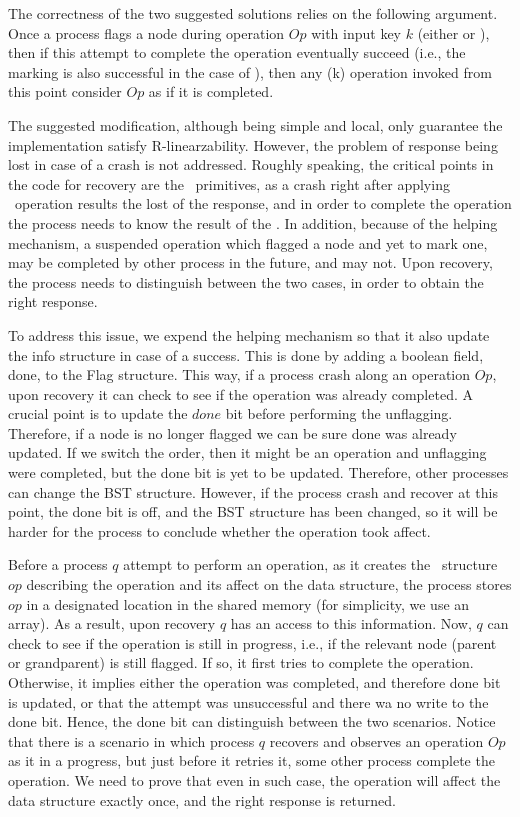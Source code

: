 The correctness of the two suggested solutions relies on the following argument.
Once a process flags a node during operation $Op$ with input key $k$ (either  or ), then if this attempt to complete the operation eventually succeed (i.e., the marking is also successful in the case of ), then any (k) operation invoked from this point consider $Op$ as if it is completed.

The suggested modification, although being simple and local, only guarantee the implementation satisfy R-linearzability. However, the problem of response being lost in case of a crash is not addressed. Roughly speaking, the critical points in the code for recovery are the \CASB\ primitives, as a crash right after applying \CASB\ operation results the lost of the response, and in order to complete the operation the process needs to know the result of the \CASB. In addition, because of the helping mechanism, a suspended  operation which flagged a node and yet to mark one, may be completed by other process in the future, and may not. Upon recovery, the process needs to distinguish between the two cases, in order to obtain the right response.

To address this issue, we expend the helping mechanism so that it also update the info structure in case of a success. This is done by adding a boolean field, done, to the Flag structure. This way, if a process crash along an operation $Op$, upon recovery it can check to see if the operation was already completed. A crucial point is to update the $done$ bit before performing the unflagging. Therefore, if a node is no longer flagged we can be sure done was already updated.
If we switch the order, then it might be an operation and unflagging were completed, but the done bit is yet to be updated. Therefore, other processes can change the BST structure. However, if the process crash and recover at this point, the done bit is off, and the BST structure has been changed, so it will be harder for the process to conclude whether the operation took affect.

Before a process $q$ attempt to perform an operation, as it creates the \Flag\ structure $op$ describing the operation and its affect on the data structure, the process stores $op$ in a designated location in the shared memory (for simplicity, we use an array). As a result, upon recovery $q$ has an access to this information. Now, $q$ can check to see if the operation is still in progress, i.e., if the relevant node (parent or grandparent) is still flagged. If so, it first tries to complete the operation. Otherwise, it implies either the operation was completed, and therefore done bit is updated, or that the attempt was unsuccessful and there wa no write to the done bit. Hence, the done bit can distinguish between the two scenarios.
Notice that there is a scenario in which process $q$ recovers and observes an operation $Op$ as it in a progress, but just before it retries it, some other process complete the operation. We need to prove that even in such case, the operation will affect the data structure exactly once, and the right response is returned.


